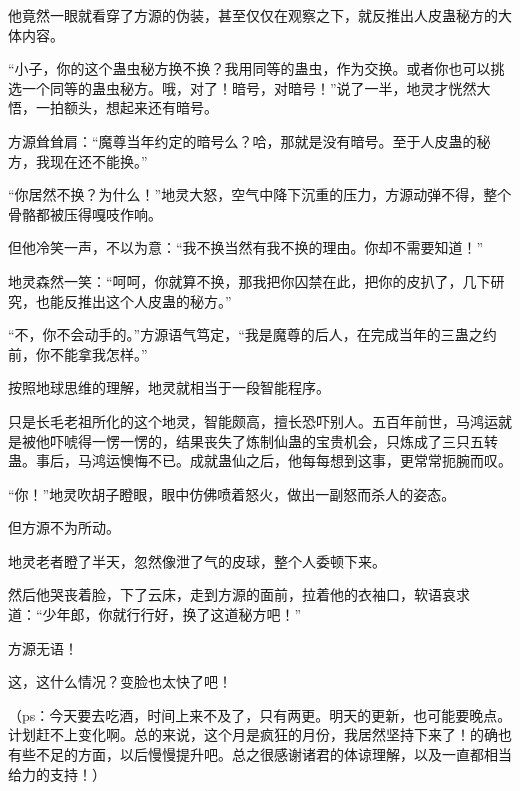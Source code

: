 \begin{this_body}
他竟然一眼就看穿了方源的伪装，甚至仅仅在观察之下，就反推出人皮蛊秘方的大体内容。

“小子，你的这个蛊虫秘方换不换？我用同等的蛊虫，作为交换。或者你也可以挑选一个同等的蛊虫秘方。哦，对了！暗号，对暗号！”说了一半，地灵才恍然大悟，一拍额头，想起来还有暗号。

方源耸耸肩：“魔尊当年约定的暗号么？哈，那就是没有暗号。至于人皮蛊的秘方，我现在还不能换。”

“你居然不换？为什么！”地灵大怒，空气中降下沉重的压力，方源动弹不得，整个骨骼都被压得嘎吱作响。

但他冷笑一声，不以为意：“我不换当然有我不换的理由。你却不需要知道！”

地灵森然一笑：“呵呵，你就算不换，那我把你囚禁在此，把你的皮扒了，几下研究，也能反推出这个人皮蛊的秘方。”

“不，你不会动手的。”方源语气笃定，“我是魔尊的后人，在完成当年的三蛊之约前，你不能拿我怎样。”

按照地球思维的理解，地灵就相当于一段智能程序。

只是长毛老祖所化的这个地灵，智能颇高，擅长恐吓别人。五百年前世，马鸿运就是被他吓唬得一愣一愣的，结果丧失了炼制仙蛊的宝贵机会，只炼成了三只五转蛊。事后，马鸿运懊悔不已。成就蛊仙之后，他每每想到这事，更常常扼腕而叹。

“你！”地灵吹胡子瞪眼，眼中仿佛喷着怒火，做出一副怒而杀人的姿态。

但方源不为所动。

地灵老者瞪了半天，忽然像泄了气的皮球，整个人委顿下来。

然后他哭丧着脸，下了云床，走到方源的面前，拉着他的衣袖口，软语哀求道：“少年郎，你就行行好，换了这道秘方吧！”

方源无语！

这，这什么情况？变脸也太快了吧！

（ps：今天要去吃酒，时间上来不及了，只有两更。明天的更新，也可能要晚点。计划赶不上变化啊。总的来说，这个月是疯狂的月份，我居然坚持下来了！的确也有些不足的方面，以后慢慢提升吧。总之很感谢诸君的体谅理解，以及一直都相当给力的支持！）

\end{this_body}

